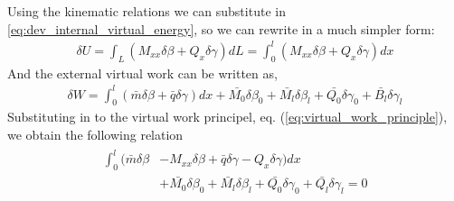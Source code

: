 \documentclass[10pt,twoside,a4paper]{article}
\begin{document}
Using the kinematic relations we can substitute in \ref{eq:dev_internal_virtual_energy}, so we can rewrite in a much simpler form:
\begin{align}
	\delta U = \int_L (M_{xx} \delta \beta + Q_x \delta \gamma) dL
				 = \int_0^l (M_{xx} \delta \beta + Q_x \delta \gamma) dx
\end{align}
And the external virtual work can be written as,
\begin{align}
	\delta W = \int_0^l (\bar{m}\delta \beta +\bar{q}\delta \gamma) dx 
				+ \bar{M_0}\delta \beta_0 + \bar{M_l}\delta \beta_l
				+ \bar{Q_0}\delta \gamma_0 + \bar{B_l}\delta \gamma_l 
\end{align}
Substituting in to the virtual work principel, eq. (\ref{eq:virtual_work_principle}), we obtain the following relation
\begin{align}
	\begin{split}
	 \int_0^l (\bar{m}\delta \beta &- M_{xx} \delta \beta 
		+ \bar{q}\delta \gamma - Q_x \delta \gamma) dx \\
		&+ \bar{M_0}\delta \beta_0 + \bar{M_l}\delta \beta_l
		+ \bar{Q_0}\delta \gamma_0 + \bar{Q_l}\delta \gamma_l = 0
	\end{split}
	\label{eq:virtual_work_beam}
\end{align}
\end{document}
